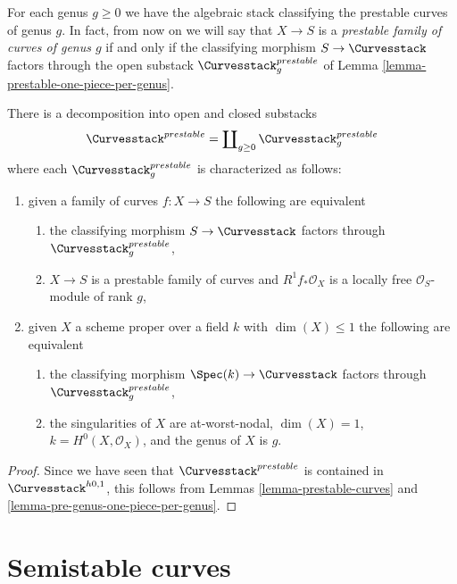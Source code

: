\noindent
For each genus $g \geq 0$ we have the algebraic stack classifying
the prestable curves of genus $g$. In fact, from now on we will say
that $X \to S$ is a {\it prestable family of curves of genus $g$}
if and only if the classifying morphism $S \to \Curvesstack$ factors through
the open substack $\Curvesstack^{prestable}_g$ of
Lemma \ref{lemma-prestable-one-piece-per-genus}.

\begin{lemma}
\label{lemma-prestable-one-piece-per-genus}
There is a decomposition into open and closed substacks
$$
\Curvesstack^{prestable} = \coprod\nolimits_{g \geq 0}
\Curvesstack^{prestable}_g
$$
where each $\Curvesstack^{prestable}_g$ is characterized as follows:
\begin{enumerate}
\item given a family of curves $f : X \to S$ the following are equivalent
\begin{enumerate}
\item the classifying morphism $S \to \Curvesstack$ factors
through $\Curvesstack^{prestable}_g$,
\item $X \to S$ is a prestable family of curves and
$R^1f_*\mathcal{O}_X$ is a locally free $\mathcal{O}_S$-module of rank $g$,
\end{enumerate}
\item given $X$ a scheme proper over a field $k$ with
$\dim(X) \leq 1$ the following are equivalent
\begin{enumerate}
\item the classifying morphism $\Spec(k) \to \Curvesstack$
factors through $\Curvesstack^{prestable}_g$,
\item the singularities of $X$ are at-worst-nodal, $\dim(X) = 1$,
$k = H^0(X, \mathcal{O}_X)$, and the genus of $X$ is $g$.
\end{enumerate}
\end{enumerate}
\end{lemma}

\begin{proof}
Since we have seen that $\Curvesstack^{prestable}$ is contained
in $\Curvesstack^{h0, 1}$, this
follows from Lemmas \ref{lemma-prestable-curves} and
\ref{lemma-pre-genus-one-piece-per-genus}.
\end{proof}





\section{Semistable curves}
\label{section-semistable-curves}

